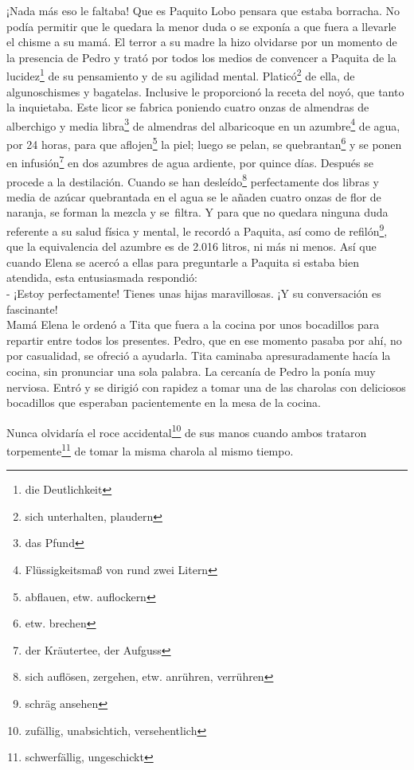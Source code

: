 ¡Nada más eso le faltaba! Que es Paquito Lobo pensara que estaba
borracha. No podía permitir que le quedara la menor duda o se exponía a
que fuera a llevarle el chisme a su mamá. El terror a su madre la hizo
olvidarse por un momento de la presencia de Pedro y trató por todos los
medios de convencer a Paquita de la lucidez\footnote{die Deutlichkeit}
de su pensamiento y de su agilidad mental. Platicó\footnote{sich unterhalten, plaudern}
de ella, de algunoschismes y bagatelas.
Inclusive le proporcionó la receta del noyó, que tanto la inquietaba.
Este licor se fabrica poniendo cuatro onzas de almendras de alberchigo y
media libra\footnote{das Pfund} de almendras del albaricoque
en un azumbre\footnote{Flüssigkeitsmaß von rund zwei Litern} de agua,
por 24 horas, para que aflojen\footnote{abflauen, etw. auflockern} la piel;
luego se pelan, se quebrantan\footnote{etw. brechen}
y se ponen en infusión\footnote{der Kräutertee, der Aufguss} en dos
azumbres de agua ardiente, por quince días. Después
se procede a la destilación. Cuando se han desleído\footnote{sich auflösen, zergehen, etw. anrühren, verrühren}
perfectamente dos libras y media de azúcar quebrantada en el agua se le añaden
cuatro onzas de flor de naranja, se forman la mezcla y se~filtra. Y para que no
quedara ninguna duda referente a su salud física y mental, le recordó a
Paquita, así como de refilón\footnote{schräg ansehen}, que
la equivalencia del azumbre es de 2.016 litros, ni más ni menos.
Así que cuando Elena se acercó a ellas para preguntarle a Paquita si
estaba bien atendida, esta entusiasmada respondió:
\\- ¡Estoy perfectamente! Tienes unas hijas maravillosas. ¡Y su %
conversación es fascinante!\\

Mamá Elena le ordenó a Tita que fuera a la cocina por unos bocadillos
para repartir entre todos los presentes. Pedro, que en ese momento pasaba
por ahí, no por casualidad, se ofreció a ayudarla. Tita caminaba
apresuradamente hacía la cocina, sin pronunciar una sola palabra. La
cercanía de Pedro la ponía muy nerviosa. Entró y se dirigió con rapidez
a tomar una de las charolas con deliciosos bocadillos que esperaban
pacientemente en la mesa de la cocina.

Nunca olvidaría el roce accidental\footnote{zufällig, unabsichtich, versehentlich}
de sus manos cuando ambos trataron torpemente\footnote{schwerfällig, ungeschickt}
de tomar la misma charola al mismo tiempo.

